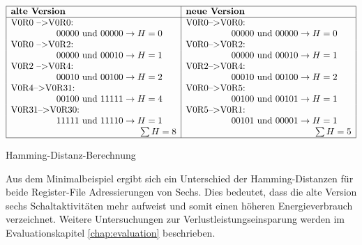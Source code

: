 \begin{table}[H]
	\centering
	$ \begin{array}{|l|l|}
	\hline
	\textbf{alte Version} & \textbf{neue Version} \\
	\hline
	\text{V0R0 -->V0R0: }&\text{V0R0-->V0R0: }\\ 
	\hspace{50pt} 00000 \text{ und } 00000 \rightarrow H= 0 &\hspace{50pt} 00000 \text{ und } 00000 \rightarrow H= 0\\
	\text{V0R0 -->V0R2: } &\text{V0R0-->V0R2: }\\
	\hspace{50pt} 00000 \text{ und } 00010 \rightarrow H= 1 &\hspace{50pt} 00000 \text{ und } 00010 \rightarrow H= 1 \\
	\text{V0R2 -->V0R4: } &\text{V0R2-->V0R4: }\\
	\hspace{50pt} 00010 \text{ und } 00100 \rightarrow H= 2 &\hspace{50pt} 00010 \text{ und } 00100 \rightarrow H= 2 \\
	\text{V0R4-->V0R31: } &\text{V0R0-->V0R5: }\\
	\hspace{50pt} 00100 \text{ und } 11111 \rightarrow H= 4 &\hspace{50pt} 00100 \text{ und } 00101 \rightarrow H= 1 \\
	\text{V0R31-->V0R30: } &\text{V0R5-->V0R1: }\\
	\hspace{50pt} 11111 \text{ und } 11110 \rightarrow H= 1 &\hspace{50pt} 00101 \text{ und } 00001 \rightarrow H= 1 \\
	\hspace{142pt} \sum H=8 &\hspace{142pt}\sum H=5 \\
	\hline
	\end{array} $
	\caption{Hamming-Distanz-Berechnung}
	\label{tab::hamming_distanz}
\end{table}
Aus dem Minimalbeispiel ergibt sich ein Unterschied der Hamming-Distanzen für beide Register-File Adressierungen von Sechs. Dies bedeutet, dass die alte Version sechs Schaltaktivitäten mehr aufweist und somit einen höheren Energieverbrauch verzeichnet. Weitere Untersuchungen zur Verlustleistungseinsparung werden im Evaluationskapitel \ref{chap:evaluation} beschrieben.




